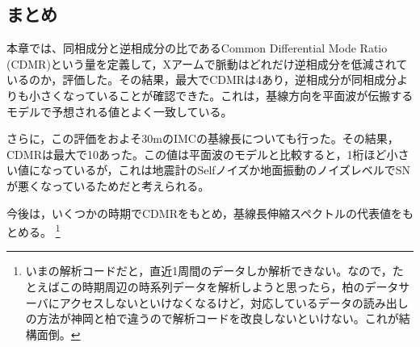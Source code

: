 \documentclass[a4paper,12pt]{jsarticle}
\begin{document}
\subsection{まとめ}
本章では、同相成分と逆相成分の比であるCommon Differential Mode Ratio (CDMR)という量を定義して，Xアームで脈動はどれだけ逆相成分を低減されているのか，評価した。その結果，最大でCDMRは4あり，逆相成分が同相成分よりも小さくなっていることが確認できた。これは，基線方向を平面波が伝搬するモデルで予想される値とよく一致している。

さらに，この評価をおよそ30mのIMCの基線長についても行った。その結果，CDMRは最大で10あった。この値は平面波のモデルと比較すると，1桁ほど小さい値になっているが，これは地震計のSelfノイズか地面振動のノイズレベルでSNが悪くなっているためだと考えられる。

今後は，いくつかの時期でCDMRをもとめ，基線長伸縮スペクトルの代表値をもとめる。 \footnote[13]{いまの解析コードだと，直近1周間のデータしか解析できない。なので，たとえばこの時期周辺の時系列データを解析しようと思ったら，柏のデータサーバにアクセスしないといけなくなるけど，対応しているデータの読み出しの方法が神岡と柏で違うので解析コードを改良しないといけない。これが結構面倒。}


\appendix




\end{document}
